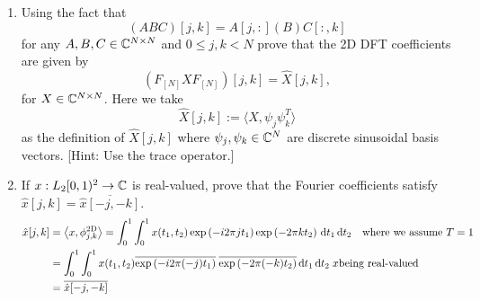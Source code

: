 \documentclass[12pt,twoside]{article}
\begin{document}
\begin{enumerate}
\begin{enumerate}
    
  \item Using the fact that
    $$(ABC)[j,k] = A[j,:](B)C[:,k]$$
    for any $A,B,C\in\mathbb{C}^{N\times N}$ and $0\leq j,k<N$ prove that
    the 2D DFT coefficients are given by
    $$(F_{[N]}XF_{[N]})[j,k] = \hat{X}[j,k],$$
    for $X\in\mathbb{C}^{N\times N}$.  Here we take
    $$\hat{X}[j,k] := \langle X,\psi_j\psi_k^T\rangle$$
    as the definition of $\hat{X}[j,k]$
    where $\psi_j,\psi_k\in\mathbb{C}^N$ are discrete
    sinusoidal basis vectors.
    [Hint: Use the trace operator.]
  \item If $x:L_2[0,1)^2\to\mathbb{C}$ is real-valued, prove that the Fourier
    coefficients satisfy $\hat{x}[j,k]=\overline{\hat{x}[-j,-k]}$.\\
\begin{align*}
   	\hat{x}[j,k]	   	&= \left \langle x, \phi_{j,k}^{\text{2D}}\right \rangle = \int_0^1 \int_0^1 x(t_1, t_2) \exp \left( - i2 \pi j t_1  \right)  \exp \left( - 2 \pi k t_2  \right) \, \text{d}t_1 \, \text{d}t_2 \text{ ~ where we assume } T = 1\\ 	
				&=   \int_0^1 \int_0^1 x(t_1, t_2) \overline{\exp \left( - i2 \pi (-j) t_1  \right)}  \;  \overline{\exp \left( - 2 \pi (-k) t_2  \right)} \, \text{d}t_1 \, \text{d}t_2 \; x \text{being real-valued}\\
				&= \overline{\hat{x}[-j,-k]} \\
\end{align*}
   
  \end{enumerate}
  

\end{enumerate}
\end{document}
